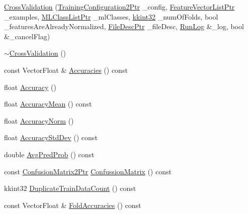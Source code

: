 \begin{DoxyCompactItemize}
\item 
\hyperlink{class_k_k_m_l_l_1_1_cross_validation_af4fc01fd2714d7967606ab8618815eeb}{Cross\+Validation} (\hyperlink{namespace_k_k_m_l_l_a5da4b334417f8c9e4e2fd5924da7fe62}{Training\+Configuration2\+Ptr} \+\_\+config, \hyperlink{namespace_k_k_m_l_l_acf2ba92a3cf03e2b19674b24ff488ef6}{Feature\+Vector\+List\+Ptr} \+\_\+examples, \hyperlink{namespace_k_k_m_l_l_af091cde3f4a4315658b41a5e7583fc26}{M\+L\+Class\+List\+Ptr} \+\_\+ml\+Classes, \hyperlink{namespace_k_k_b_a8fa4952cc84fda1de4bec1fbdd8d5b1b}{kkint32} \+\_\+num\+Of\+Folds, bool \+\_\+features\+Are\+Already\+Normalized, \hyperlink{namespace_k_k_m_l_l_aa0d0b6ab4ec18868a399b8455b05d914}{File\+Desc\+Ptr} \+\_\+file\+Desc, \hyperlink{class_k_k_b_1_1_run_log}{Run\+Log} \&\+\_\+log, bool \&\+\_\+cancel\+Flag)
\item 
\hyperlink{class_k_k_m_l_l_1_1_cross_validation_a1e65ae700add864f2f85dcdf82940d74}{$\sim$\+Cross\+Validation} ()
\item 
const Vector\+Float \& \hyperlink{class_k_k_m_l_l_1_1_cross_validation_a2222ba93f166f6db9494f9fdc5a56c75}{Accuracies} () const 
\item 
float \hyperlink{class_k_k_m_l_l_1_1_cross_validation_af43d0127d482cc937f26f3c908f1dce4}{Accuracy} ()
\item 
float \hyperlink{class_k_k_m_l_l_1_1_cross_validation_af66bad932ef54965d12307068534e03e}{Accuracy\+Mean} () const 
\item 
float \hyperlink{class_k_k_m_l_l_1_1_cross_validation_a321f3d5d6692801ecb21166bbc1bb491}{Accuracy\+Norm} ()
\item 
float \hyperlink{class_k_k_m_l_l_1_1_cross_validation_a397020480a04a141e740f48dbaf0c594}{Accuracy\+Std\+Dev} () const 
\item 
double \hyperlink{class_k_k_m_l_l_1_1_cross_validation_afaa192679b6564041b60ae429d0d6b6b}{Avg\+Pred\+Prob} () const 
\item 
const \hyperlink{namespace_k_k_m_l_l_a724c9a3c5315800e128adf68253e91ae}{Confusion\+Matrix2\+Ptr} \hyperlink{class_k_k_m_l_l_1_1_cross_validation_a57350f7bf18af38472f76e0194d77e85}{Confussion\+Matrix} () const 
\item 
kkint32 \hyperlink{class_k_k_m_l_l_1_1_cross_validation_affcc2d2a0c458da5676ab53c6856e46c}{Duplicate\+Train\+Data\+Count} () const 
\item 
const Vector\+Float \& \hyperlink{class_k_k_m_l_l_1_1_cross_validation_abfb24e91b2600d45dce91dc8dd13e3e2}{Fold\+Accuracies} () const 

\end{DoxyCompactItemize}
